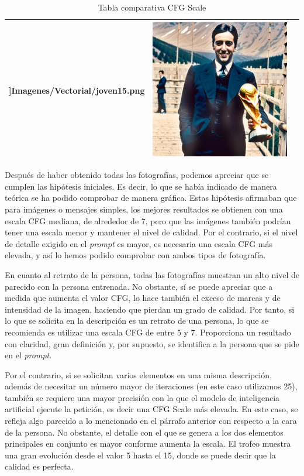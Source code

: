 \begin{table}
\begin{tabular}{>{\centering\arraybackslash}m{3cm} >{\arraybackslash}m{5cm}>{\arraybackslash}m{5cm}}
		\textwidth]{Imagenes/Vectorial/joven15.png} & \includegraphics[width = 0.25
		\textwidth]{Imagenes/Vectorial/mundial15.png}\\
		\hline
	\end{tabular}
	\caption{Tabla comparativa CFG Scale}
	\label{tab:tablacfgscale}
\end{table}

Después de haber obtenido todas las fotografías, podemos apreciar que se cumplen las hipótesis iniciales. Es decir, lo que se había indicado de manera teórica se ha podido comprobar de manera gráfica. Estas hipótesis afirmaban que para imágenes o mensajes simples, los mejores resultados se obtienen con una escala CFG mediana, de alrededor de 7, pero que las imágenes también podrían tener una escala menor y mantener el nivel de calidad. Por el contrario, si el nivel de detalle exigido en el \textit{prompt} es mayor, es necesaria una escala CFG más elevada, y así lo hemos podido comprobar con ambos tipos de fotografía. 

En cuanto al retrato de la persona, todas las fotografías muestran un alto nivel de parecido con la persona entrenada. No obstante, sí se puede apreciar que a medida que aumenta el valor CFG, lo hace también el exceso de marcas y de intensidad de la imagen, haciendo que pierdan un grado de calidad. Por tanto, si lo que se solicita en la descripción es un retrato de una persona, lo que se recomienda es utilizar una escala CFG de entre 5 y 7. Proporciona un resultado con claridad, gran definición y, por supuesto, se identifica a la persona que se pide en el \textit{prompt}.

Por el contrario, si se solicitan varios elementos en una misma descripción, además de necesitar un número mayor de iteraciones (en este caso utilizamos 25), también se requiere una mayor precisión con la que el modelo de inteligencia artificial ejecute la petición, es decir una CFG Scale más elevada. En este caso, se refleja algo parecido a lo mencionado en el párrafo anterior con respecto a la cara de la persona. No obstante, el detalle con el que se genera a los dos elementos principales en conjunto es mayor conforme aumenta la escala. El trofeo muestra una gran evolución desde el valor 5 hasta el 15, donde se puede decir que la calidad es perfecta.

